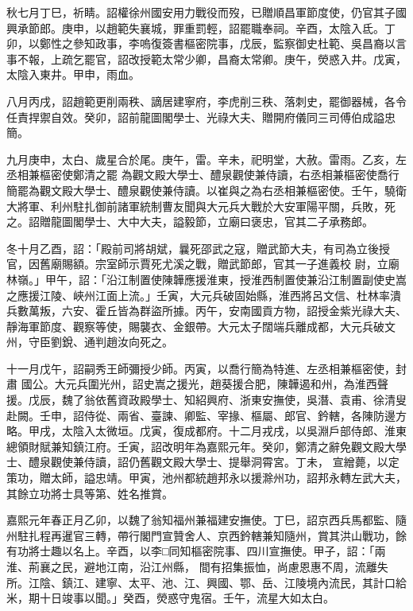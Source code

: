 \begin{pinyinscope}
 秋七月丁巳，祈睛。詔權徐州國安用力戰役而歿，已贈順昌軍節度使，仍官其子國興承節郎。庚申，以趙範失襄城，罪重罰輕，詔罷職奉祠。辛酉，太陰入氐。丁
 卯，以鄭性之參知政事，李嗚復簽書樞密院事，戊辰，監察御史杜範、吳昌裔以言事不報，上疏乞罷官，詔改授範太常少卿，昌裔太常卿。庚午，熒惑入井。戊寅，太陰入東井。甲申，雨血。



 八月丙戌，詔趙範更削兩秩、謫居建寧府，李虎削三秩、落刺史，罷御器械，各令任責捍禦自效。癸卯，詔前龍圖閣學士、光祿大夫、贈開府儀同三司傅伯成謚忠簡。



 九月庚申，太白、歲星合於尾。庚午，雷。辛未，祀明堂，大赦。雷雨。乙亥，左丞相兼樞密使鄭清之罷
 為觀文殿大學士、醴泉觀使兼侍讀，右丞相兼樞密使喬行簡罷為觀文殿大學士、醴泉觀使兼侍讀。以崔與之為右丞相兼樞密使。壬午，驍衛大將軍、利州駐扎御前諸軍統制曹友聞與大元兵大戰於大安軍陽平關，兵敗，死之。詔贈龍圖閣學士、大中大夫，謚毅節，立廟曰褒忠，官其二子承務郎。



 冬十月乙酉，詔：「殿前司將胡斌，曩死邵武之寇，贈武節大夫，有司為立後授官，因舊廟賜額。宗室師示賈死尤溪之戰，贈武節郎，官其一子進義校
 尉，立廟林嶺。」甲午，詔：「沿江制置使陳韡應援淮東，授淮西制置使兼沿江制置副使史嵩之應援江陵、峽州江面上流。」壬寅，大元兵破固始縣，淮西將呂文信、杜林率潰兵數萬叛，六安、霍丘皆為群盜所據。丙午，安南國貢方物，詔授金紫光祿大夫、靜海軍節度、觀察等使，賜襲衣、金銀帶。大元太子闊端兵離成都，大元兵破文州，守臣劉銳、通判趙汝向死之。



 十一月戊午，詔嗣秀王師彌授少師。丙寅，以喬行簡為特進、左丞相兼樞密使，封肅
 國公。大元兵圍光州，詔史嵩之援光，趙葵援合肥，陳韡遏和州，為淮西聲援。戊辰，魏了翁依舊資政殿學士、知紹興府、浙東安撫使，吳潛、袁甫、徐清叟赴闕。壬申，詔侍從、兩省、臺諫、卿監、宰掾、樞屬、郎官、鈐轄，各陳防邊方略。甲戌，太陰入太微垣。戊寅，復成都府。十二月戎戌，以吳淵戶部侍郎、淮東總領財賦兼知鎮江府。壬寅，詔改明年為嘉熙元年。癸卯，鄭清之辭免觀文殿大學士、醴泉觀使兼侍讀，詔仍舊觀文殿大學士、提舉洞霄宮。丁未，
 宣繒薨，以定策功，贈太師，謚忠靖。甲寅，池州都統趙邦永以援滁州功，詔邦永轉左武大夫，其餘立功將士具等第、姓名推賞。



 嘉熙元年春正月乙卯，以魏了翁知福州兼福建安撫使。丁巳，詔京西兵馬都監、隨州駐扎程再暹官三轉，帶行閣門宣贊舍人、京西鈐轄兼知隨州，賞其洪山戰功，餘有功將士趣以名上。辛酉，以李□同知樞密院事、四川宣撫使。甲子，詔：「兩淮、荊襄之民，避地江南，沿江州縣，
 間有招集振恤，尚慮恩惠不周，流離失所。江陰、鎮江、建寧、太平、池、江、興國、鄂、岳、江陵境內流民，其計口給米，期十日竣事以聞。」癸酉，熒惑守鬼宿。壬午，流星大如太白。




\end{pinyinscope}
